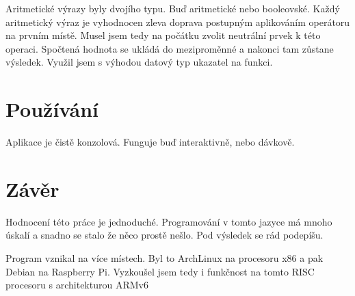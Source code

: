 \documentclass{article}
\begin{document}
Aritmetické výrazy byly dvojího typu. Buď aritmetické nebo
booleovské. Každý aritmetický výraz je vyhodnocen zleva doprava
postupným aplikováním operátoru na prvním místě. Musel jsem
tedy na počátku zvolit neutrální prvek k této operaci. Spočtená
hodnota se ukládá do meziproměnné a nakonci tam zůstane výsledek.
Využil jsem s výhodou datový typ ukazatel na funkci.

\section{Používání}
Aplikace je čistě konzolová. Funguje buď interaktivně, nebo
dávkově.

\section{Závěr}
Hodnocení této práce je jednoduché. Programování v tomto jazyce má
mnoho úskalí a snadno se stalo že něco prostě nešlo. Pod výsledek se
rád podepíšu.

Program vznikal na více místech. Byl to ArchLinux na procesoru x86 a
pak Debian na Raspberry Pi. Vyzkoušel jsem tedy i funkčnost na tomto
RISC procesoru s architekturou ARMv6
\end{document}
